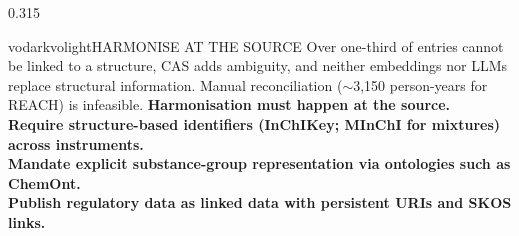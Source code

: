 \documentclass[final]{beamer}
\newlength{\colh}
\newcommand{\demand}[2]{%
    \colorbox{voyellow}{\makebox[11mm]{\rule[-2.2mm]{0pt}{9mm}\bfseries\Large\color{vodark}#1}}%
    \enspace\textbf{#2}}
\begin{document}
\begin{frame}[t]
\begin{columns}[t,onlytextwidth]
\begin{column}{0.315\textwidth}
\begin{minipage}[t][\colh][s]{\linewidth}
\begin{pbox}{vodark}{volight}{HARMONISE AT THE SOURCE}
                        \justifying
                        Over one-third of entries cannot be linked to a structure, CAS adds ambiguity,
                        and neither embeddings nor LLMs replace structural information. Manual
                        reconciliation (${\sim}$3,150 person-years for REACH) is infeasible.
                        \textbf{Harmonisation must happen at the source.}\\[4mm]
                        \demand{1}{Require structure-based identifiers (InChIKey; MInChI for
                        mixtures) across instruments.}\\[3mm]
                        \demand{2}{Mandate explicit substance-group representation via
                        ontologies such as ChemOnt.}\\[3mm]
                        \demand{3}{Publish regulatory data as linked data with persistent URIs
                        and SKOS links.}
                    \end{pbox}
                \end{minipage}
            \end{column}

        \end{columns}

        \vfill
        \begin{tcolorbox}[enhanced, colback=vodark, colframe=vodark, boxrule=0pt,
            arc=0pt, sharp corners, left=14mm, right=14mm, top=7mm, bottom=7mm,
            borderline west={6mm}{0mm}{voyellow}]
            \begin{minipage}[c]{0.5\linewidth}
                {\color{white}\large

}
\end{minipage}
\end{tcolorbox}
\end{frame}
\end{document}
